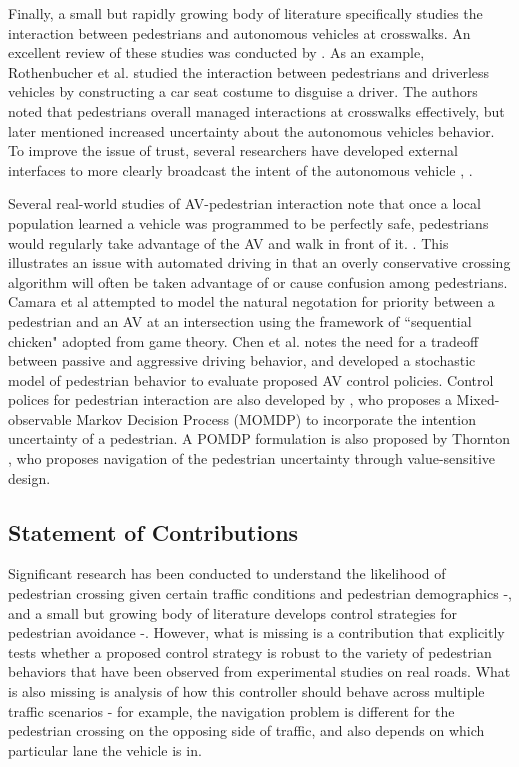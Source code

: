 \documentclass[letterpaper, 10 pt, conference]{ieeeconf}  %
\begin{document}
Finally, a small but rapidly growing body of literature specifically studies the interaction between pedestrians and autonomous vehicles at crosswalks. An excellent review of these studies was conducted by \cite{Rasouli}. As an example, Rothenbucher et al. \cite{Rothenbucher2016} studied the interaction between pedestrians and driverless vehicles by constructing a car seat costume to disguise a driver. The authors noted that pedestrians overall managed interactions at crosswalks effectively, but later mentioned increased uncertainty about the autonomous vehicles behavior. To improve the issue of trust, several researchers have developed external interfaces to more clearly broadcast the intent of the autonomous vehicle \cite{Matthews}, \cite{Lagstrom2015}. 

Several real-world studies of AV-pedestrian interaction note that once a local population learned a vehicle was programmed to be perfectly safe, pedestrians would regularly take advantage of the AV and walk in front of it. \cite{Madigan}. This illustrates an issue with automated driving in that an overly conservative crossing algorithm will often be taken advantage of or cause confusion among pedestrians. Camara et al \cite{Camara2018} attempted to model the natural negotation for priority between a pedestrian and an AV at an intersection using the framework of ``sequential chicken" adopted from game theory. Chen et al. \cite{Chen} notes the need for a tradeoff between passive and aggressive driving behavior, and developed a stochastic model of pedestrian behavior to evaluate proposed AV control policies. Control polices for pedestrian interaction are also developed by \cite{Bandyopadhyay}, who proposes a Mixed-observable Markov Decision Process (MOMDP) to incorporate the intention uncertainty of a pedestrian. A POMDP formulation is also proposed by Thornton \cite{Thornton2018}, who proposes navigation of the pedestrian uncertainty through value-sensitive design. 

\subsection{Statement of Contributions}
Significant research has been conducted to understand the likelihood of pedestrian crossing given certain traffic conditions and pedestrian demographics \cite{Schroeder2011} -\cite{Lee2005}, and a small but growing body of literature develops control strategies for pedestrian avoidance \cite{Bandyopadhyay}-\cite{Thornton2018}. However, what is missing is a contribution that explicitly  tests whether a proposed control strategy is robust to the variety of pedestrian behaviors that have been observed from experimental studies on real roads. What is also missing is analysis of how this controller should behave across multiple traffic scenarios - for example, the navigation problem is different for the pedestrian crossing on the opposing side of traffic, and also depends on which particular lane the vehicle is in.   
\end{document}
